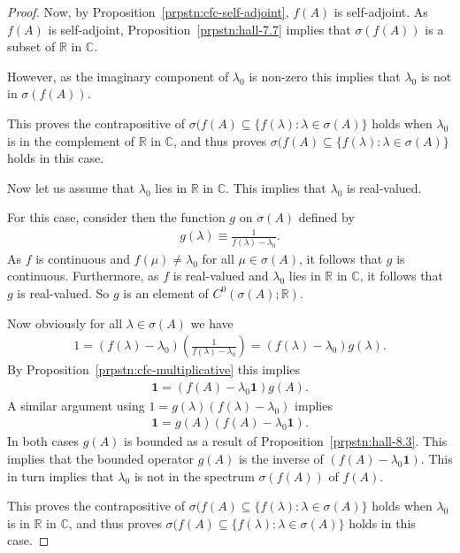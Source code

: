 \begin{proof}
Now, by Proposition~\ref{prpstn:cfc-self-adjoint}, $f(A)$ is self-adjoint. As $f(A)$ is self-adjoint, Proposition~\ref{prpstn:hall-7.7} implies that $\sigma(f(A))$ is a subset of $\mathbb{R}$ in $\mathbb{C}$.

However, as the imaginary component of $\lambda_0$ is non-zero this implies that $\lambda_0$ is not in $\sigma(f(A))$.

This proves the contrapositive of $\sigma(f(A) \subseteq \{ f(\lambda) : \lambda \in \sigma(A) \}$ holds when $\lambda_0$ is in the complement of $\mathbb{R}$ in $\mathbb{C}$, and thus proves $\sigma(f(A) \subseteq \{ f(\lambda) : \lambda \in \sigma(A) \}$ holds in this case.

Now let us assume that $\lambda_0$ lies in $\mathbb{R}$ in $\mathbb{C}$. This implies that $\lambda_0$ is real-valued.

For this case, consider then the function $g$ on $\sigma(A)$ defined by
\begin{align}
    g(\lambda) \equiv \frac{1}{f(\lambda) - \lambda_0}.
\end{align}
As $f$ is continuous and $f(\mu) \neq \lambda_0$ for all $\mu \in \sigma(A)$, it follows that $g$ is continuous. Furthermore, as $f$ is real-valued and $\lambda_0$ lies in $\mathbb{R}$ in $\mathbb{C}$, it follows that $g$ is real-valued. So $g$ is an element of $C^0(\sigma(A); \mathbb{R})$.

Now obviously for all $\lambda \in \sigma(A)$ we have
\begin{align}
    1 = (f(\lambda) - \lambda_0) \left( \frac{1}{f(\lambda) - \lambda_0} \right) = (f(\lambda) - \lambda_0) g(\lambda).
\end{align}
By Proposition~\ref{prpstn:cfc-multiplicative} this implies
\begin{align}
    \mathbf{1} = (f(A) - \lambda_0 \mathbf{1}) g(A).
\end{align}
A similar argument using $1 = g(\lambda) (f(\lambda) - \lambda_0)$ implies
\begin{align}
    \mathbf{1} = g(A) (f(A) - \lambda_0 \mathbf{1}).
\end{align}
In both cases $g(A)$ is bounded as a result of Proposition~\ref{prpstn:hall-8.3}. This implies that the bounded operator $g(A)$ is the inverse of $(f(A) - \lambda_0 \mathbf{1})$. This in turn implies that $\lambda_0$ is not in the spectrum $\sigma(f(A))$ of $f(A)$.

This proves the contrapositive of $\sigma(f(A) \subseteq \{ f(\lambda) : \lambda \in \sigma(A) \}$ holds when $\lambda_0$ is in $\mathbb{R}$ in $\mathbb{C}$, and thus proves $\sigma(f(A) \subseteq \{ f(\lambda) : \lambda \in \sigma(A) \}$ holds in this case.


\end{proof}
